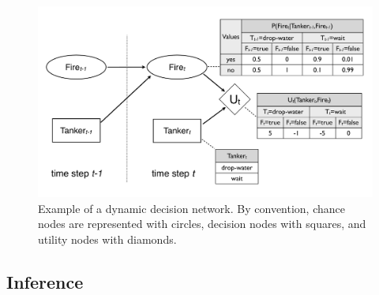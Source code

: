 \begin{figure}[ht]
\centering
\includegraphics[scale=0.25]{imgs/ddn.pdf}
\caption{Example of a dynamic decision network. By convention, chance nodes are represented with circles, decision nodes with squares, and utility nodes with diamonds. }
\label{fig:ddn}
\end{figure}


\subsection{Inference} 
\label{sec:inference}

